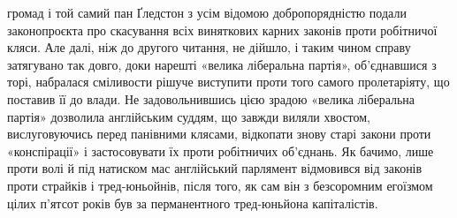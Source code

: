 \parcont{}  %
громад і той самий пан Ґледстон з усім відомою добропорядністю
подали законопроєкта про скасування всіх виняткових карних
законів проти робітничої кляси. Але далі, ніж до другого читання,
не дійшло, і таким чином справу затягувано так довго, доки
нарешті «велика ліберальна партія», об’єднавшися з торі, набралася
сміливости рішуче виступити проти того самого пролетаріяту,
що поставив її до влади. Не задовольнившись цією зрадою
«велика ліберальна партія» дозволила англійським суддям,
що завжди виляли хвостом, вислуговуючись перед панівними
клясами, відкопати знову старі закони проти «конспірації»
і застосовувати їх проти робітничих об’єднань. Як бачимо,
лише проти волі й під натиском мас англійський парлямент відмовився
від законів проти страйків і тред-юньойнів, після того,
як сам він з безсоромним егоїзмом цілих п’ятсот років був за
перманентного тред-юньйона капіталістів.

